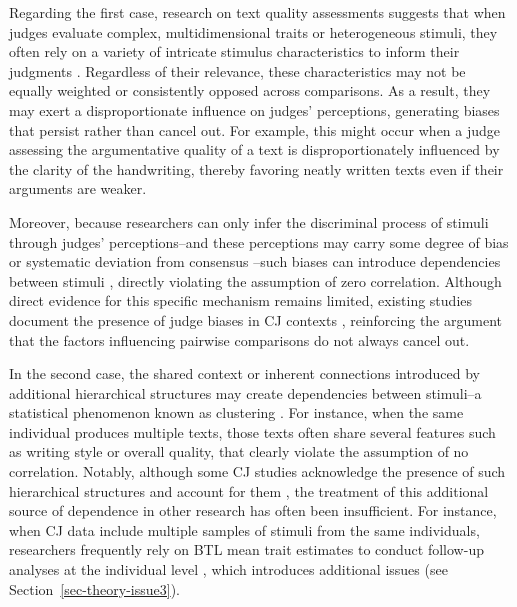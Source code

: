 \documentclass[
  authoryear,
  review,
  1p]{elsarticle}
\begin{document}
Regarding the first case, research on text quality assessments suggests
that when judges evaluate complex, multidimensional traits or
heterogeneous stimuli, they often rely on a variety of intricate
stimulus characteristics to inform their judgments
\citep{vanDaal_et_al_2016, Lesterhuis_et_al_2018, Chambers_et_al_2022}.
Regardless of their relevance, these characteristics may not be equally
weighted or consistently opposed across comparisons. As a result, they
may exert a disproportionate influence on judges' perceptions,
generating biases that persist rather than cancel out. For example, this
might occur when a judge assessing the argumentative quality of a text
is disproportionately influenced by the clarity of the handwriting,
thereby favoring neatly written texts even if their arguments are
weaker.

Moreover, because researchers can only infer the discriminal process of
stimuli through judges' perceptions--and these perceptions may carry
some degree of bias or systematic deviation from consensus
\citep[see][]{Pollitt_et_al_2003, vanDaal_et_al_2016}--such biases can
introduce dependencies between stimuli
\citep{vanderLinden_et_al_2017_II}, directly violating the assumption of
zero correlation. Although direct evidence for this specific mechanism
remains limited, existing studies document the presence of judge biases
in CJ contexts
\citep{Pollitt_et_al_2003, vanDaal_et_al_2016, Bartholomew_et_al_2020a},
reinforcing the argument that the factors influencing pairwise
comparisons do not always cancel out.

In the second case, the shared context or inherent connections
introduced by additional hierarchical structures may create dependencies
between stimuli--a statistical phenomenon known as clustering
\citep{Everitt_et_al_2010}. For instance, when the same individual
produces multiple texts, those texts often share several features such
as writing style or overall quality, that clearly violate the assumption
of no correlation. Notably, although some CJ studies acknowledge the
presence of such hierarchical structures and account for them
\citep[e.g.,][]{Pritikin_2020, Schramm_et_al_2021, Seymour_et_al_2022, Seymour_et_al_2025},
the treatment of this additional source of dependence in other research
has often been insufficient. For instance, when CJ data include multiple
samples of stimuli from the same individuals, researchers frequently
rely on BTL mean trait estimates to conduct follow-up analyses at the
individual level
\citep{vanDaal_et_al_2017, Jones_et_al_2019, Bramley_et_al_2019, Boonen_et_al_2020, Gijsen_et_al_2021, Bouwer_et_al_2023},
which introduces additional issues (see
Section~\ref{sec-theory-issue3}).
\end{document}
